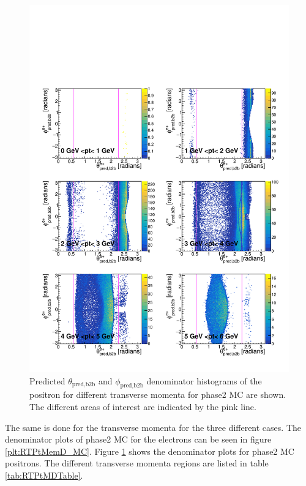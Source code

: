 \documentclass[a4paper,11pt,twosided,final,german,openbib,pdftex,listof=totoc,bibliography=totoc]{scrbook}
\begin{document}
\begin{figure}[h!]
	\includegraphics[width=\textwidth]{Plots/master/RTPtMepD_MC.pdf}
	\caption[Denominator $\theta_{\textrm{pred,b2b}}$-$\phi_{\textrm{pred,b2b}}$ Positron Transverse Momentum MC]{Predicted $\theta_{\textrm{pred,b2b}}$ and $\phi_{\textrm{pred,b2b}}$ denominator histograms of the positron for different transverse momenta for phase2 MC are shown. The different areas of interest are indicated by the pink line.
}
	\label{plt:RTPtMepD_MC}
\end{figure}

The same is done for the transverse momenta for the three different cases. The denominator plots of phase2 MC for the electrons can be seen in figure \ref{plt:RTPtMemD_MC}. Figure \ref{plt:RTPtMepD_MC} shows the denominator plots for phase2 MC positrons. The different transverse momenta regions are listed in table \ref{tab:RTPtMDTable}.
\end{document}
